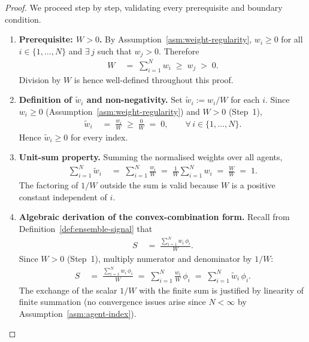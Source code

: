 \documentclass[12pt,openany]{book}
\numberwithin{equation}{chapter}
\theoremstyle{plain}
\theoremstyle{definition}
\theoremstyle{remark}
\numberwithin{equation}{chapter}
\theoremstyle{plain}
\begin{document}
\begin{proof}
We proceed step by step, validating every prerequisite and
boundary condition.

\begin{enumerate}

  \item \textbf{Prerequisite: $W > 0$.}
        By Assumption~\ref{asm:weight-regularity},
        $w_i \geq 0$ for all $i \in \{1,\ldots,N\}$ and
        $\exists\, j$ such that $w_j > 0$.
        Therefore
        \begin{align}
          W
          &\;=\; \sum_{i=1}^{N} w_i
          \;\geq\; w_j
          \;>\; 0.
        \end{align}
        Division by $W$ is hence well-defined throughout this proof.

  \item \textbf{Definition of $\tilde{w}_i$ and non-negativity.}
        Set $\tilde{w}_i := w_i / W$ for each $i$.
        Since $w_i \geq 0$ (Assumption~\ref{asm:weight-regularity})
        and $W > 0$ (Step~1),
        \begin{align}
          \tilde{w}_i
          &\;=\; \frac{w_i}{W}
          \;\geq\; \frac{0}{W}
          \;=\; 0,
          \qquad \forall\, i \in \{1,\ldots,N\}.
        \end{align}
        Hence $\tilde{w}_i \geq 0$ for every index.

  \item \textbf{Unit-sum property.}
        Summing the normalised weights over all agents,
        \begin{align}
          \sum_{i=1}^{N} \tilde{w}_i
          &\;=\; \sum_{i=1}^{N} \frac{w_i}{W}
          \;=\; \frac{1}{W}\sum_{i=1}^{N} w_i
          \;=\; \frac{W}{W}
          \;=\; 1.
        \end{align}
        The factoring of $1/W$ outside the sum is valid because $W$
        is a positive constant independent of $i$.

  \item \textbf{Algebraic derivation of the convex-combination form.}
        Recall from Definition~\ref{def:ensemble-signal} that
        \begin{align}
          S
          &\;=\;
          \frac{\displaystyle\sum_{i=1}^{N} w_i\,\phi_i}
               {W}.
        \end{align}
        Since $W > 0$ (Step~1), multiply numerator and denominator
        by $1/W$:
        \begin{align}
          S
          &\;=\;
          \frac{\displaystyle\sum_{i=1}^{N} w_i\,\phi_i}{W}
          \;=\;
          \sum_{i=1}^{N} \frac{w_i}{W}\,\phi_i
          \;=\;
          \sum_{i=1}^{N} \tilde{w}_i\,\phi_i.
        \end{align}
        The exchange of the scalar $1/W$ with the finite sum is
        justified by linearity of finite summation (no convergence
        issues arise since $N < \infty$ by
        Assumption~\ref{asm:agent-index}).


\end{enumerate}
\end{proof}
\end{document}
